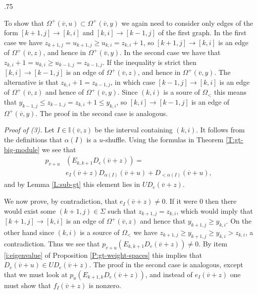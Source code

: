 \documentclass[11pt,fleqn]{amsart}
\makeatletter
\renewcommand\proofname{Proof}
\renewenvironment{proof}[1][\textit{\proofname}]{\par
 \pushQED{\qed}%
 \normalfont \topsep.75\paraskip\relax
 \trivlist
 \item[\hskip\labelsep
 \itshape
 #1\@addpunct{.}]\ignorespaces
}{%
 \popQED\endtrivlist\@endpefalse
}
\newcounter{para}[section]
\renewcommand\to{\rightarrow}
\newcommand\vv{\overline{v}}
\newcommand\II{\mathbb I}
\makeatother
\begin{document}
\begin{proof}
To show that $\Omega^+(\vv, u) \subset \Omega^+(\vv, y)$ we again need to 
consider only edges of the form $[k+1,j] \to [k,i]$ and $[k,i] \to [k-1,j]$ 
of the first graph. In the first case we have $z_{k+1,j} = u_{k+1,j} \geq
u_{k,i} = z_{k,i} + 1$, so $[k+1,j] \to [k,i]$ is an edge of $\Omega^+(\vv,z)$,
and hence in $\Omega^+(\vv,y)$. In the second case we have that $z_{k,i} +1 =
u_{k,i} \geq u_{k-1,j} = z_{k-1,j}$. If the inequality is strict then $[k,i]
\to [k-1,j]$ is an edge of $\Omega^+(\vv,z)$, and hence in $\Omega^+(\vv,y)$.
The alternative is that $z_{k,i} + 1 = z_{k-1,j}$, in which case $[k-1,j]
\to [k,i]$ is an edge of $\Omega^+(\vv,z)$ and hence of $\Omega^+(\vv,y)$. 
Since $(k,i)$ is a soure of $\Omega_<$ this means that $y_{k-1,j} \leq 
z_{k-1,j} = z_{k,i} + 1 \leq y_{k,i}$, so $[k,i] \to [k-1,j]$ is an edge of 
$\Omega^+(\vv,y)$. The proof in the second case is analogous.

\emph{Proof of (3).} Let $I \in \II(\vv,z)$ be the interval containing 
$(k,i)$. It follows from the definitions that $\alpha(I)$ is a $u$-shuffle.
Using the formulas in Theorem \ref{T:gt-big-module} we see that
\begin{align*}
p_{\vv+u}&(E_{k,k+1} D_e(\vv + z)) =\\
	&e_I(\vv + z) D_{\alpha(I)}(\vv + u) + D_{<\alpha(I)}(\vv + u),
\end{align*}
and by Lemma \ref{L:sub-gt} this element lies in $U D_e(\vv + z)$. 

We now prove, by contradiction, that $e_I(\vv + z) \neq 0$. If it were $0$
then there would exist some $(k+1,j) \in \Sigma$ such that $z_{k+1,j} = 
z_{k,i}$, which would imply that $[k+1,j] \to [k,i]$ is an edge of 
$\Omega^+(\vv, z)$ and hence that $y_{k+1,j} \geq y_{k,i}$. On the other hand
since $(k,i)$ is a source of $\Omega_<$ we have $z_{k+1,j} \geq y_{k+1,j} \geq 
y_{k,i} > z_{k,i}$, a contradiction. 
Thus we see that $p_{\vv+u}(E_{k,k+1} D_e(\vv + z)) \neq 0$. By item 
\ref{i:eigenvalue} of Proposition \ref{P:gt-weight-spaces} this implies that
$D_e(\vv + u) \in U D_e(\vv + z)$. The proof in the second case is analogous,
except that we must look at $p_u(E_{k+1,k} D_e(\vv + z))$, and instead of 
$e_I(\vv+z)$ one must show that $f_I(\vv + z)$ is nonzero.


\end{proof}
\end{document}
